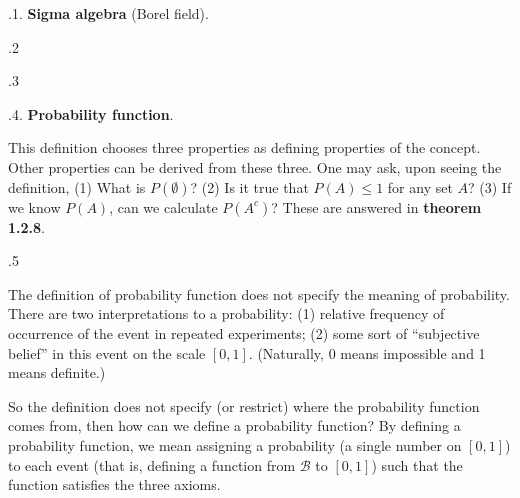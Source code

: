 \documentclass[12pt]{article}
\begin{document}
.1. \textbf{Sigma algebra} (Borel field).


.2

.3

.4. \textbf{Probability function}.


This definition chooses three properties as defining properties of the
concept. Other properties can be derived from these three.
One may ask, upon seeing the definition,
(1) What is $P(\emptyset)$?
(2) Is it true that $P(A) \le 1$ for any set $A$?
(3) If we know $P(A)$, can we calculate $P(A^c)$?
These are answered in
\textbf{theorem 1.2.8}.

.5

The definition of probability function does not specify
the meaning of probability. There are two interpretations to a
probability: (1) relative frequency of occurrence of the event in
repeated experiments; (2) some sort of ``subjective belief'' in this
event on the scale $[0, 1]$.
(Naturally, 0 means impossible and 1 means definite.)

So the definition does not specify (or restrict) where the probability
function comes from, then how can we define a probability function?
By defining a probability function, we mean
assigning a probability (a single number on $[0,1]$) to each event
(that is, defining a function from $\mathcal{B}$ to $[0,1]$)
such that the function satisfies the three axioms.
\end{document}
